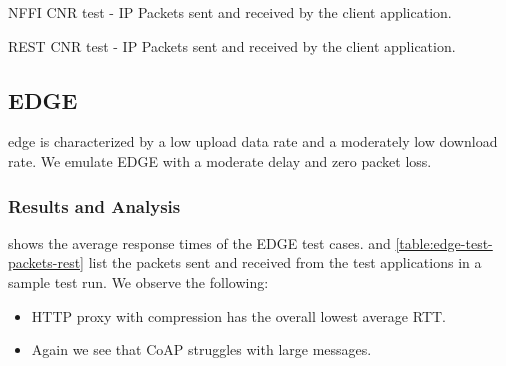 \begin{table}[h]

\caption{NFFI CNR test - IP Packets sent and received by the client application.}
\label{table:cnr-test-packets-nffi}
\end{table}

\begin{table}[h]

\caption{REST CNR test - IP Packets sent and received by the client application.}
\label{table:cnr-test-packets-rest}
\end{table}


\subsection{EDGE}

\gls{edge} is characterized by a low upload data rate and a moderately low
download rate. We emulate EDGE with a moderate delay and zero packet loss.

\subsubsection{Results and Analysis}

 shows the average response times of the EDGE test
cases.  and
\cref{table:edge-test-packets-rest} list the packets sent and received from the
test applications in a sample test run. We observe the following:

\begin{itemize}

    \item HTTP proxy with compression has the overall lowest average RTT.

    \item Again we see that CoAP struggles with large messages.


\end{itemize}

